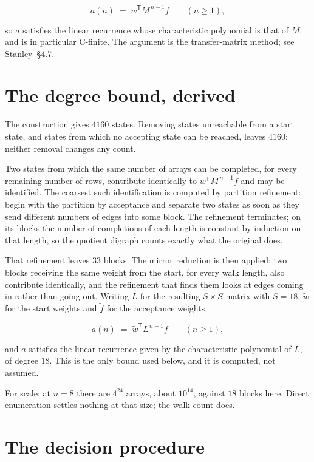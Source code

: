 \documentclass[11pt]{article}
\theoremstyle{definition}
\begin{document}
\[a(n) \;=\; w^{\mathsf T} M^{\,n-1} f \qquad (n \ge 1),\]

so $a$ satisfies the linear recurrence whose characteristic polynomial is that of $M$, and is in particular C-finite. The argument is the transfer-matrix method; see Stanley~\S4.7.

\section{The degree bound, derived}

The construction gives $4160$ states. Removing states unreachable from a start state, and states from which no accepting state can be reached, leaves $4160$; neither removal changes any count.

Two states from which the same number of arrays can be completed, for every remaining number of rows, contribute identically to $w^{\mathsf T}M^{\,n-1}f$ and may be identified. The coarsest such identification is computed by partition refinement: begin with the partition by acceptance and separate two states as soon as they send different numbers of edges into some block. The refinement terminates; on its blocks the number of completions of each length is constant by induction on that length, so the quotient digraph counts exactly what the original does.

That refinement leaves $33$ blocks. The mirror reduction is then applied: two blocks receiving the same weight from the start, for every walk length, also contribute identically, and the refinement that finds them looks at edges coming in rather than going out. Writing $L$ for the resulting $S \times S$ matrix with $S = 18$, $\tilde w$ for the start weights and $\tilde f$ for the acceptance weights,

\[a(n) \;=\; \tilde w^{\mathsf T} L^{\,n-1} \tilde f \qquad (n \ge 1),\]

and $a$ satisfies the linear recurrence given by the characteristic polynomial of $L$, of degree $18$. This is the only bound used below, and it is computed, not assumed.

For scale: at $n = 8$ there are $4^{24}$ arrays, about $10^{14}$, against $18$ blocks here. Direct enumeration settles nothing at that size; the walk count does.

\section{The decision procedure}
\end{document}
